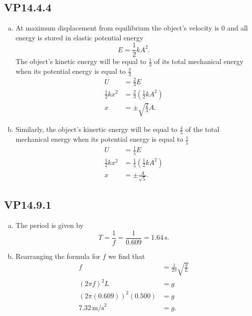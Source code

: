 \documentclass{article}
\begin{document}
\subsection{VP14.4.4}

\begin{enumerate}[a)]
  \item At maximum displacement from equilibrium the object's velocity is 0 and all energy is stored in elastic potential energy \[E = \frac{1}{2}kA^2.\] The object's kinetic energy will be equal to $\frac{1}{3}$ of its total mechanical energy when its potential energy is equal to $\frac{2}{3}$
        \begin{align*}
          U               & = \frac{2}{3}E                            \\
          \frac{1}{2}kx^2 & = \frac{2}{3}\left(\frac{1}{2}kA^2\right) \\
          x               & = \pm\sqrt{\frac{2}{3}}A.
        \end{align*}

  \item Similarly, the object's kinertic energy will be equal to $\frac{4}{5}$ of the total mechanical energy when its potential energy is equal to $\frac{1}{5}$
        \begin{align*}
          U               & = \frac{1}{5}E                            \\
          \frac{1}{2}kx^2 & = \frac{1}{5}\left(\frac{1}{2}kA^2\right) \\
          x               & = \pm\frac{A}{\sqrt{5}}.
        \end{align*}
\end{enumerate}

\subsection{VP14.9.1}

\begin{enumerate}[a)]
  \item The period is given by \[T = \frac{1}{f} = \frac{1}{0.609} = 1.64 \,\textrm{s}.\]

  \item Rearranging the formula for $f$ we find that
        \begin{align*}
          f                      & = \frac{1}{2\pi}\sqrt{\frac{g}{L}} \\
          (2\pi f)^2L            & = g                                \\
          (2\pi(0.609))^2(0.500) & = g                                \\
          7.32 \,\textrm{m/s}^2  & = g.
        \end{align*}
\end{enumerate}
\end{document}

